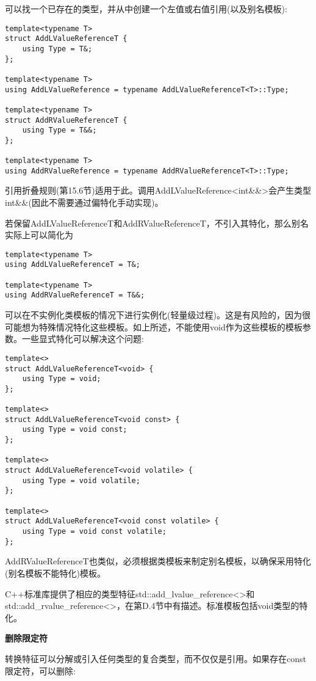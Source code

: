 可以找一个已存在的类型，并从中创建一个左值或右值引用(以及别名模板):

\begin{lstlisting}[style=styleCXX]
template<typename T>
struct AddLValueReferenceT {
	using Type = T&;
};

template<typename T>
using AddLValueReference = typename AddLValueReferenceT<T>::Type;

template<typename T>
struct AddRValueReferenceT {
	using Type = T&&;
};

template<typename T>
using AddRValueReference = typename AddRValueReferenceT<T>::Type;
\end{lstlisting}

引用折叠规则(第15.6节)适用于此。调用AddLValueReference<int\&\&>会产生类型int\&\&(因此不需要通过偏特化手动实现)。

若保留AddLValueReferenceT和AddRValueReferenceT，不引入其特化，那么别名实际上可以简化为

\begin{lstlisting}[style=styleCXX]
template<typename T>
using AddLValueReferenceT = T&;

template<typename T>
using AddRValueReferenceT = T&&;
\end{lstlisting}

可以在不实例化类模板的情况下进行实例化(轻量级过程)。这是有风险的，因为很可能想为特殊情况特化这些模板。如上所述，不能使用void作为这些模板的模板参数。一些显式特化可以解决这个问题:

\begin{lstlisting}[style=styleCXX]
template<>
struct AddLValueReferenceT<void> {
	using Type = void;
};

template<>
struct AddLValueReferenceT<void const> {
	using Type = void const;
};

template<>
struct AddLValueReferenceT<void volatile> {
	using Type = void volatile;
};

template<>
struct AddLValueReferenceT<void const volatile> {
	using Type = void const volatile;
};
\end{lstlisting}

AddRValueReferenceT也类似，必须根据类模板来制定别名模板，以确保采用特化(别名模板不能特化)模板。

C++标准库提供了相应的类型特征std::add\_lvalue\_reference<>和std::add\_rvalue\_reference<>，在第D.4节中有描述。标准模板包括void类型的特化。

\noindent
\textbf{删除限定符}

转换特征可以分解或引入任何类型的复合类型，而不仅仅是引用。如果存在const限定符，可以删除:

